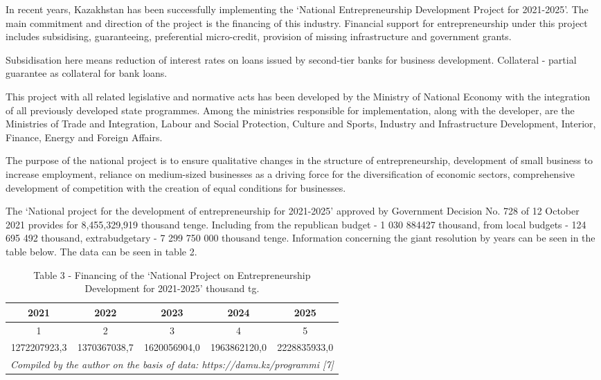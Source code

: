 \begin{multicols}{2}
In recent years, Kazakhstan has been successfully implementing the
`National Entrepreneurship Development Project for 2021-2025'. The main
commitment and direction of the project is the financing of this
industry. Financial support for entrepreneurship under this project
includes subsidising, guaranteeing, preferential micro-credit, provision
of missing infrastructure and government grants.

Subsidisation here means reduction of interest rates on loans issued by
second-tier banks for business development. Collateral - partial
guarantee as collateral for bank loans.

This project with all related legislative and normative acts has been
developed by the Ministry of National Economy with the integration of
all previously developed state programmes. Among the ministries
responsible for implementation, along with the developer, are the
Ministries of Trade and Integration, Labour and Social Protection,
Culture and Sports, Industry and Infrastructure Development, Interior,
Finance, Energy and Foreign Affairs.

The purpose of the national project is to ensure qualitative changes in
the structure of entrepreneurship, development of small business to
increase employment, reliance on medium-sized businesses as a driving
force for the diversification of economic sectors, comprehensive
development of competition with the creation of equal conditions for
businesses.

The `National project for the development of entrepreneurship for
2021-2025' approved by Government Decision No. 728 of 12 October 2021
provides for 8,455,329,919 thousand tenge. Including from the republican
budget - 1 030 884427 thousand, from local budgets - 124 695 492
thousand, extrabudgetary - 7 299 750 000 thousand tenge. Information
concerning the giant resolution by years can be seen in the table below.
The data can be seen in table 2.
\end{multicols}

\begin{table}[H]
\caption*{Table 3 - Financing of the `National Project on Entrepreneurship Development for 2021-2025' thousand tg.}
\centering
\begin{tabular}{|llllc|}
\hline
\multicolumn{1}{|c|}{2021} & \multicolumn{1}{c|}{2022} & \multicolumn{1}{c|}{2023} & \multicolumn{1}{c|}{2024} & 2025 \\ \hline
\multicolumn{1}{|c|}{1}    & \multicolumn{1}{c|}{2}    & \multicolumn{1}{c|}{3}    & \multicolumn{1}{c|}{4}    & 5    \\ \hline
\multicolumn{1}{|c|}{1272207923,3} &
  \multicolumn{1}{c|}{1370367038,7} &
  \multicolumn{1}{c|}{1620056904,0} &
  \multicolumn{1}{c|}{1963862120,0} &
  \multicolumn{1}{c|}{2228835933,0} \\ \hline
\multicolumn{5}{|l|}{\textit{Compiled by the author on the basis of data: https://damu.kz/programmi {[}7{]}}}         \\ \hline
\end{tabular}
\end{table}

